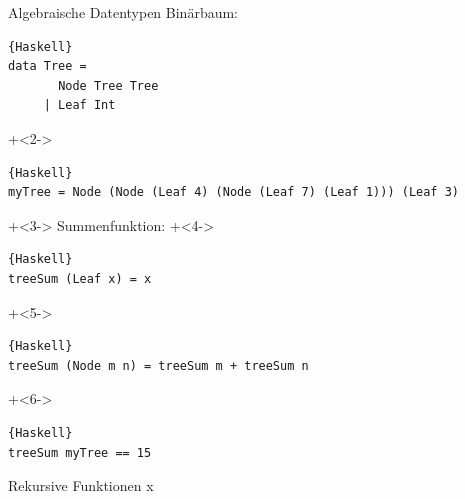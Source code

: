 \begin{frame}[fragile]{Algebraische Datentypen}
Binärbaum:
\begin{lstlisting}{Haskell}
data Tree =
       Node Tree Tree
     | Leaf Int
\end{lstlisting}

\onslide+<2->
\begin{lstlisting}{Haskell}
myTree = Node (Node (Leaf 4) (Node (Leaf 7) (Leaf 1))) (Leaf 3)
\end{lstlisting}

\onslide+<3->
Summenfunktion:
\onslide+<4->
\begin{lstlisting}{Haskell}
treeSum	(Leaf x) = x
\end{lstlisting}
\onslide+<5->
\vspace{-1.1em}
\begin{lstlisting}{Haskell}
treeSum (Node m n) = treeSum m + treeSum n
\end{lstlisting}
\onslide+<6->
\begin{lstlisting}{Haskell}
treeSum myTree == 15
\end{lstlisting}
\end{frame}


\begin{frame}[fragile]{Rekursive Funktionen}
x
\end{frame}




